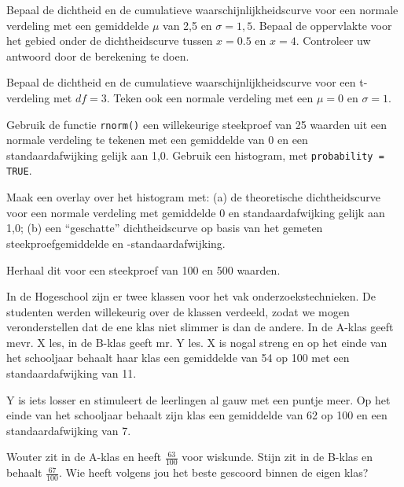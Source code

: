 \begin{exercise}
	Bepaal de dichtheid en de cumulatieve waarschijnlijkheidscurve voor een normale verdeling met een gemiddelde $\mu$
	van 2,5 en $\sigma = 1,5$. Bepaal de oppervlakte voor het gebied onder de dichtheidscurve tussen
	$x = 0.5$ en $x = 4$. Controleer uw antwoord door de berekening te doen.
\end{exercise}

\begin{exercise}
	Bepaal de dichtheid en de cumulatieve waarschijnlijkheidscurve voor een t-verdeling met $df = 3$. Teken ook een normale verdeling met een $\mu = 0$  en $\sigma = 1$.
\end{exercise}

\begin{exercise}
Gebruik de functie \verb|rnorm()| een willekeurige steekproef van 25 waarden uit een normale verdeling te tekenen met een gemiddelde van 0 en een standaardafwijking gelijk aan 1,0. Gebruik een histogram, met \verb|probability = TRUE|.

Maak een overlay over het histogram met: (a) de theoretische dichtheidscurve voor een normale verdeling met gemiddelde 0 en standaardafwijking gelijk aan 1,0; (b) een ``geschatte'' dichtheidscurve op basis van het gemeten steekproefgemiddelde en -standaardafwijking.

Herhaal dit voor een steekproef van 100 en 500 waarden.
\end{exercise}

\begin{exercise}
  In de  Hogeschool zijn er twee klassen voor het vak onderzoekstechnieken. De studenten werden willekeurig over de klassen verdeeld, zodat we mogen veronderstellen dat de ene klas niet slimmer is dan de andere. In de A-klas geeft mevr. X les, in de B-klas geeft mr. Y les. X is nogal streng en op het einde van het schooljaar behaalt haar klas een gemiddelde van 54 op 100 met een standaardafwijking van 11.

  Y is iets losser en stimuleert de leerlingen al gauw met een puntje meer. Op het einde van het schooljaar behaalt zijn klas een gemiddelde van 62 op 100 en een standaardafwijking van 7.

  Wouter zit in de A-klas en heeft $\frac{63}{100}$ voor wiskunde. Stijn zit in de B-klas en behaalt $\frac{67}{100}$. Wie heeft volgens jou het beste gescoord binnen de eigen klas?
\end{exercise}

